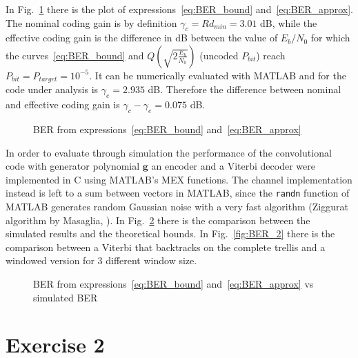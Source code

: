 \documentclass[10pt]{article}
\newlength\fheight
\newlength\fwidth
\begin{document}
In Fig.~\ref{fig:BER_theory} there is the plot of expressions~\eqref{eq:BER_bound} and~\eqref{eq:BER_approx}. The nominal coding gain is by definition $\gamma_c = Rd_{min} = 3.01$ dB, while the effective coding gain is the difference in dB between the value of $E_b/N_0$ for which the curves~\eqref{eq:BER_bound} and $Q\left(\sqrt{2\frac{E_b}{N_0}}\right)$ (uncoded $P_{bit}$) reach $P_{bit} = P_{target} = 10^{-5}$. It can be numerically evaluated with MATLAB and for the code under analysis is $\gamma_e = 2.935$ dB. Therefore the difference between nominal and effective coding gain is $\gamma_c - \gamma_e = 0.075$ dB.
\begin{figure}[t]
\centering
\setlength{}
\setlength{}

\caption{BER from expressions~\eqref{eq:BER_bound} and~\eqref{eq:BER_approx}}
\label{fig:BER_theory}
\end{figure}

In order to evaluate through simulation the performance of the convolutional code with generator polynomial $\mathbf{g}$ an encoder and a Viterbi decoder were implemented in C using MATLAB's MEX functions. The channel implementation instead is left to a sum between vectors in MATLAB, since the \texttt{randn} function of MATLAB generates random Gaussian noise with a very fast algorithm (Ziggurat algorithm by Masaglia, \cite{moler}).
In Fig.~\ref{fig:BER_1} there is the comparison between the simulated results and the theoretical bounds.
In Fig.~\ref{fig:BER_2} there is the comparison between a Viterbi that backtracks on the complete trellis and a windowed version for 3 different window size.


\begin{figure}[t]
\centering
\setlength{}
\setlength{}

\caption{BER from expressions~\eqref{eq:BER_bound} and~\eqref{eq:BER_approx} vs simulated BER}
\label{fig:BER_1}
\end{figure}




\section*{Exercise 2}

\begin{thebibliography}{10}

\end{thebibliography}
\end{document}

